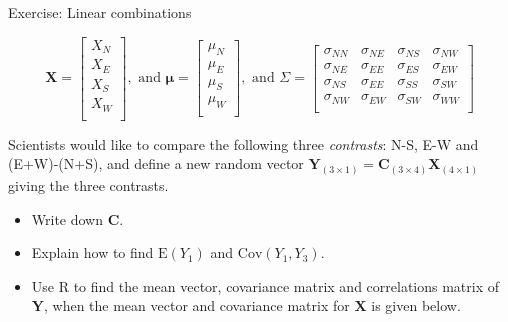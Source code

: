 \documentclass[ignorenonframetext,]{beamer}
\providecommand{\tightlist}{%
  \setlength{\itemsep}{0pt}\setlength{\parskip}{0pt}}
\begin{document}
\begin{frame}

\begin{block}{Exercise: Linear combinations}

\[\mathbf{X}=\left[ \begin{array}{c} X_N\\
          X_E\\
X_S\\
          X_W\\
          \end{array}
          \right], \text{ and }
          \mathbf{\mu}=\left[
      \begin{array}{c} \mu_N\\
          \mu_E\\
\mu_S\\
          \mu_W\\
          \end{array}
          \right], \text{ and } \Sigma=\left[ \begin{array}{cccc}
    \sigma_{NN} & \sigma_{NE} & \sigma_{NS} & \sigma_{NW}\\
    \sigma_{NE} & \sigma_{EE} & \sigma_{ES}& \sigma_{EW}\\
        \sigma_{NS} & \sigma_{EE} & \sigma_{SS}& \sigma_{SW}\\
    \sigma_{NW} & \sigma_{EW} & \sigma_{SW} & \sigma_{WW}\\
\end{array} \right]\]

Scientists would like to compare the following three \emph{contrasts}:
N-S, E-W and (E+W)-(N+S), and define a new random vector
\(\mathbf{Y}_{(3\times 1)}=\mathbf{C}_{(3\times 4)} \mathbf{X}_{(4\times 1)}\)
giving the three contrasts.

\begin{itemize}
\tightlist
\item
  Write down \(\mathbf{C}\).
\item
  Explain how to find \(\text{E}(Y_1)\) and \(\text{Cov}(Y_1,Y_3)\).
\item
  Use R to find the mean vector, covariance matrix and correlations
  matrix of \(\mathbf{Y}\), when the mean vector and covariance matrix
  for \(\mathbf{X}\) is given below.
\end{itemize}

\end{block}

\end{frame}
\end{document}
